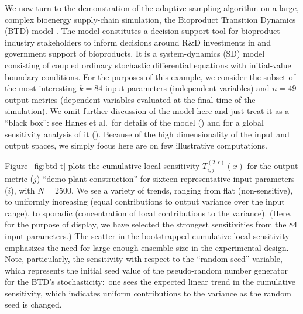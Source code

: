 \documentclass[12pt]{article}
\begin{document}
We now turn to the demonstration of the adaptive-sampling algorithm on a large, complex bioenergy supply-chain simulation, the Bioproduct Transition Dynamics (BTD) model \citep{hanes_supporting_2020,hanes_transition_2019,hanes_introduction_2018,hanes_system_2018}.
The model constitutes a decision support tool for bioproduct industry stakeholders to inform decisions around R\&D investments in and government support of bioproducts. It is a system-dynamics (SD) model consisting of coupled ordinary stochastic differential equations with initial-value boundary conditions.
For the purposes of this example, we consider the subset of the most interesting $k = 84$ input parameters (independent variables) and $n = 49$ output metrics (dependent variables evaluated at the final time of the simulation). We omit further discussion of the model here and just treat it as a ``black box'': see Hanes et al.\ for details of the model (\citeyear{btd_tech_report}) and for a global sensitivity analysis of it (\citeyear{btd_analysis_paper}). Because of the high dimensionality of the input and output spaces, we simply focus here are on few illustrative computations.

Figure~\ref{fig:btd-t} plots the cumulative local sensitivity $T_{i,j}^{(2,\epsilon)}(x)$ for the output metric ($j$) ``demo plant construction'' for sixteen representative input parameters ($i$), with $N = 2500$. We see a variety of trends, ranging from flat (non-sensitive), to uniformly increasing (equal contributions to output variance over the input range), to sporadic (concentration of local contributions to the variance). (Here, for the purpose of display, we have selected the strongest sensitivities from the 84 input parameters.) The scatter in the bootstrapped cumulative local sensitivity emphasizes the need for large enough ensemble size in the experimental design. Note, particularly, the sensitivity with respect to the ``random seed'' variable, which represents the initial seed value of the pseudo-random number generator for the BTD's stochasticity:\ one sees the expected linear trend in the cumulative sensitivity, which indicates uniform contributions to the variance as the random seed is changed.
\end{document}
